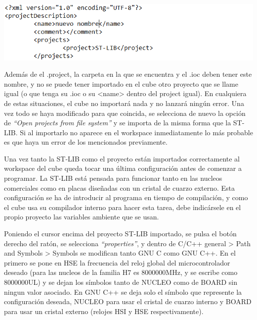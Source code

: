 \documentclass{report}
\begin{document}
\includegraphics{Imagenes/cambios project.PNG}

\par \vspace{0.3 cm}
Además de el .project, la carpeta en la que se encuentra y el .ioc deben tener este nombre, y no se puede tener importado en el cube otro proyecto que se llame igual (o que tenga su .ioc o su <name> dentro del project igual). En cualquiera de estas situaciones, el cube no importará nada y no lanzará ningún error. Una vez todo se haya modificado para que coincida, se selecciona de nuevo la opción de \textit{``Open projects from file system''} y se importa de la misma forma que la ST-LIB. Si al importarlo no aparece en el workspace inmediatamente lo más probable es que haya un error de los mencionados previamente.  
\par \vspace{0.3cm}
Una vez tanto la ST-LIB como el proyecto están importados correctamente al workspace del cube queda tocar una última configuración antes de comenzar a programar. La ST-LIB está pensada para funcionar tanto en las nucleos comerciales como en placas diseñadas con un cristal de cuarzo externo. Esta configuración se ha de introducir al programa en tiempo de compilación, y como el cube usa su compilador interno para hacer esta tarea, debe indicársele en el propio proyecto las variables ambiente que se usan. 
\par \vspace{0.3cm}
Poniendo el cursor encima del proyecto ST-LIB importado, se pulsa el botón derecho del ratón, se selecciona \textit{``properties''}, y dentro de C/C++ general > Path and Symbols > Symbols se modifican tanto GNU C como GNU C++. En el primero se pone en HSE la frecuencia del reloj global del microcontrolador deseado (para las nucleos de la familia H7 es 8000000MHz, y se escribe como 8000000UL) y se dejan los símbolos tanto de NUCLEO como de BOARD sin ningun valor asociado. En GNU C++ se deja solo el símbolo que represente la configuración deseada, NUCLEO para usar el cristal de cuarzo interno y BOARD para usar un cristal externo (relojes HSI y HSE respectivamente). \par
\end{document}
